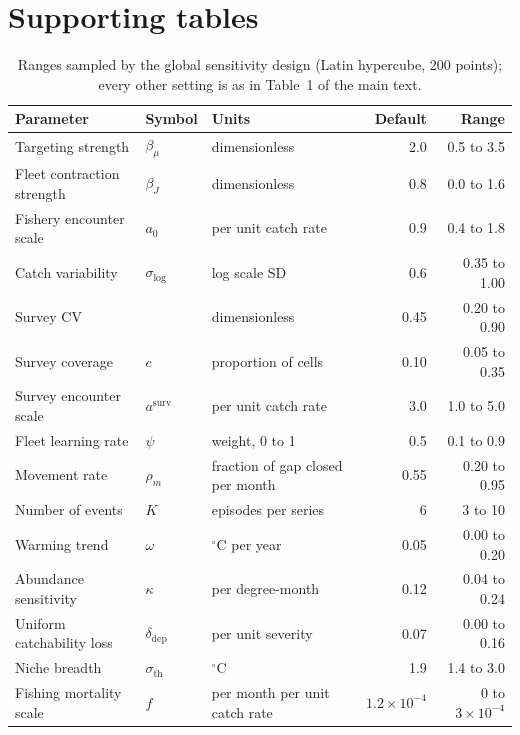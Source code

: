\documentclass[11pt,a4paper]{article}
\newcommand{\vt}[1]{\text{#1}}
\begin{document}
\clearpage
\section*{Supporting tables}

\begin{table}[htbp]
\centering\footnotesize
\caption{Ranges sampled by the global sensitivity design (Latin hypercube, 200 points); every other setting is as in Table~1 of the main text.}
\label{tab:sensranges}
\begin{tabular}{@{}lllrr@{}}
\toprule
Parameter & Symbol & Units & Default & Range \\
\midrule
Targeting strength & $\beta_\mu$ & dimensionless & 2.0 & 0.5 to 3.5 \\
Fleet contraction strength & $\beta_J$ & dimensionless & 0.8 & 0.0 to 1.6 \\
Fishery encounter scale & $a_0$ & per unit catch rate & 0.9 & 0.4 to 1.8 \\
Catch variability & $\sigma_{\log}$ & log scale SD & 0.6 & 0.35 to 1.00 \\
Survey CV & & dimensionless & 0.45 & 0.20 to 0.90 \\
Survey coverage & $c$ & proportion of cells & 0.10 & 0.05 to 0.35 \\
Survey encounter scale & $a^{\vt{surv}}$ & per unit catch rate & 3.0 & 1.0 to 5.0 \\
Fleet learning rate & $\psi$ & weight, 0 to 1 & 0.5 & 0.1 to 0.9 \\
Movement rate & $\rho_m$ & fraction of gap closed per month & 0.55 & 0.20 to 0.95 \\
Number of events & $K$ & episodes per series & 6 & 3 to 10 \\
Warming trend & $\omega$ & $^\circ$C per year & 0.05 & 0.00 to 0.20 \\
Abundance sensitivity & $\kappa$ & per degree-month & 0.12 & 0.04 to 0.24 \\
Uniform catchability loss & $\delta_{\vt{dep}}$ & per unit severity & 0.07 & 0.00 to 0.16 \\
Niche breadth & $\sigma_{\vt{th}}$ & $^\circ$C & 1.9 & 1.4 to 3.0 \\
Fishing mortality scale & $f$ & per month per unit catch rate & $1.2\times10^{-4}$ & 0 to $3\times10^{-4}$ \\
\bottomrule
\end{tabular}
\end{table}
\end{document}
